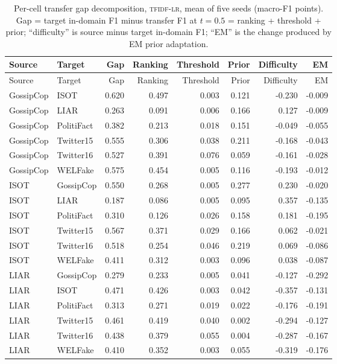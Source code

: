 \begin{longtable}{@{}llrrrrrr@{}}
\caption{Per-cell transfer gap decomposition, \textsc{tfidf-lr}, mean of five seeds (macro-F1 points). Gap = target in-domain F1 minus transfer F1 at $t=0.5$ = ranking + threshold + prior; ``difficulty'' is source minus target in-domain F1; ``EM'' is the change produced by EM prior adaptation.}\label{tab:supp-decomp}\\
\toprule
Source & Target & Gap & Ranking & Threshold & Prior & Difficulty & EM \\
\midrule
\endfirsthead
\toprule
Source & Target & Gap & Ranking & Threshold & Prior & Difficulty & EM \\
\midrule
\endhead
GossipCop & ISOT & 0.620 & 0.497 & 0.003 & 0.121 & -0.230 & -0.009 \\
GossipCop & LIAR & 0.263 & 0.091 & 0.006 & 0.166 & 0.127 & -0.009 \\
GossipCop & PolitiFact & 0.382 & 0.213 & 0.018 & 0.151 & -0.049 & -0.055 \\
GossipCop & Twitter15 & 0.555 & 0.306 & 0.038 & 0.211 & -0.168 & -0.043 \\
GossipCop & Twitter16 & 0.527 & 0.391 & 0.076 & 0.059 & -0.161 & -0.028 \\
GossipCop & WELFake & 0.575 & 0.454 & 0.005 & 0.116 & -0.193 & -0.012 \\
ISOT & GossipCop & 0.550 & 0.268 & 0.005 & 0.277 & 0.230 & -0.020 \\
ISOT & LIAR & 0.187 & 0.086 & 0.005 & 0.095 & 0.357 & -0.135 \\
ISOT & PolitiFact & 0.310 & 0.126 & 0.026 & 0.158 & 0.181 & -0.195 \\
ISOT & Twitter15 & 0.567 & 0.371 & 0.029 & 0.166 & 0.062 & -0.021 \\
ISOT & Twitter16 & 0.518 & 0.254 & 0.046 & 0.219 & 0.069 & -0.086 \\
ISOT & WELFake & 0.411 & 0.312 & 0.003 & 0.096 & 0.038 & -0.087 \\
LIAR & GossipCop & 0.279 & 0.233 & 0.005 & 0.041 & -0.127 & -0.292 \\
LIAR & ISOT & 0.471 & 0.426 & 0.003 & 0.042 & -0.357 & -0.131 \\
LIAR & PolitiFact & 0.313 & 0.271 & 0.019 & 0.022 & -0.176 & -0.191 \\
LIAR & Twitter15 & 0.461 & 0.419 & 0.040 & 0.002 & -0.294 & -0.127 \\
LIAR & Twitter16 & 0.438 & 0.379 & 0.055 & 0.004 & -0.287 & -0.167 \\
LIAR & WELFake & 0.410 & 0.352 & 0.003 & 0.055 & -0.319 & -0.176 \\

\end{longtable}
